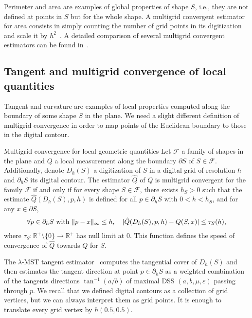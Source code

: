 Perimeter and area are examples of global properties of shape $S$, i.e., they are not defined at points in $S$ but for the whole shape. A multigrid convergent estimator for area consists in simply counting the number of grid points in its digitization and scale it by $h^2$~\cite{klette00multigrid}. A detailed comparison of several multigrid convergent estimators can be found in~\cite{coeurjolly12multigrid}.


\subsection{Tangent and multigrid convergence of local quantities}

Tangent and curvature are examples of local properties computed along the boundary of some shape $S$ in the plane. We need a slight different definition of multigrid convergence in order to map points of the Euclidean boundary to those in the digital contour.

\begin{definition}{Multigrid convergence for local geometric quantities}
Let $\mathcal{F}$ a family of shapes in the plane and $Q$ a local measurement along the boundary $\partial S$ of $S \in \mathcal{F}$. Additionally, denote $D_h(S)$ a digitization of $S$ in a digital grid of resolution $h$ and $\partial_h S$ its digital contour. The estimator $\hat{Q}$ of $Q$ is multigrid convergent for the family $\mathcal{F}$ if and only if for every shape $S \in \mathcal{F}$, there exists $h_S > 0$ such that the estimate $\hat{Q}(D_h(S),p,h)$ is defined for all $p \in \partial_h S$ with $0 < h < h_S$, and for any $x \in \partial S$,
\begin{align*}
	\forall p \in \partial_h S \text{ with } \lVert p-x\rVert_{\infty} \leq h,\quad | \hat{Q}(D_h(S),p,h) - Q(S,x) | \leq \tau_S(h),	
\end{align*}
where $\tau_S:\mathbb{R}^+\setminus \{0\} \rightarrow \mathbb{R}^+$ has null limit at $0$. This function defines the speed of convergence of $\hat{Q}$ towards $Q$ for $S$.
\end{definition}


The $\lambda$-MST tangent estimator~\cite{lachaud07tangent} computes the tangential cover of $D_h(S)$ and then estimates the tangent direction at point $p \in \partial_h S$ as a weighted combination of the tangents directions $\tan^{-1}(a/b)$  of maximal DSS $(a,b,\mu,\varepsilon)$ passing through $p$. We recall that we defined digital contours as a collection of grid vertices, but we can always interpret them as grid points. It is enough to translate every grid vertex by $h(0.5,0.5)$.

